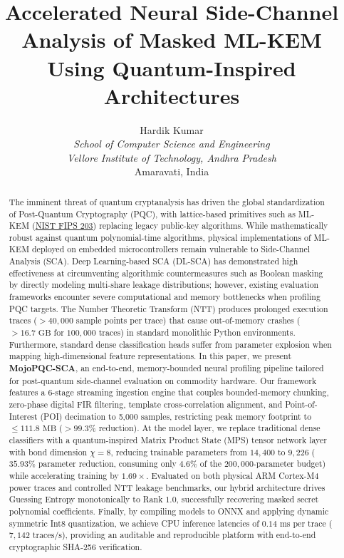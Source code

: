 \documentclass[letterpaper]{article}
\title{Accelerated Neural Side-Channel Analysis of Masked ML-KEM Using Quantum-Inspired Architectures}
\author{
    Hardik Kumar \\
    \textit{School of Computer Science and Engineering} \\
    \textit{Vellore Institute of Technology, Andhra Pradesh} \\
    Amaravati, India
}
\begin{document}
\thispagestyle{firstpagehf}
\maketitle

\begin{abstract}
The imminent threat of quantum cryptanalysis has driven the global standardization of Post-Quantum Cryptography (PQC), with lattice-based primitives such as ML-KEM (\href{https://csrc.nist.gov/pubs/fips/203/final}{NIST FIPS 203}) replacing legacy public-key algorithms. While mathematically robust against quantum polynomial-time algorithms, physical implementations of ML-KEM deployed on embedded microcontrollers remain vulnerable to Side-Channel Analysis (SCA). Deep Learning-based SCA (DL-SCA) has demonstrated high effectiveness at circumventing algorithmic countermeasures such as Boolean masking by directly modeling multi-share leakage distributions; however, existing evaluation frameworks encounter severe computational and memory bottlenecks when profiling PQC targets. The Number Theoretic Transform (NTT) produces prolonged execution traces ($>40,000$ sample points per trace) that cause out-of-memory crashes ($>16.7\text{ GB}$ for $100,000$ traces) in standard monolithic Python environments. Furthermore, standard dense classification heads suffer from parameter explosion when mapping high-dimensional feature representations. In this paper, we present \textbf{MojoPQC-SCA}, an end-to-end, memory-bounded neural profiling pipeline tailored for post-quantum side-channel evaluation on commodity hardware. Our framework features a 6-stage streaming ingestion engine that couples bounded-memory chunking, zero-phase digital FIR filtering, template cross-correlation alignment, and Point-of-Interest (POI) decimation to 5,000 samples, restricting peak memory footprint to $\le 111.8\text{ MB}$ ($>99.3\%$ reduction). At the model layer, we replace traditional dense classifiers with a quantum-inspired Matrix Product State (MPS) tensor network layer with bond dimension $\chi = 8$, reducing trainable parameters from $14,400$ to $9,226$ ($35.93\%$ parameter reduction, consuming only $4.6\%$ of the $200,000$-parameter budget) while accelerating training by $1.69\times$. Evaluated on both physical ARM Cortex-M4 power traces and controlled NTT leakage benchmarks, our hybrid architecture drives Guessing Entropy monotonically to Rank $1.0$, successfully recovering masked secret polynomial coefficients. Finally, by compiling models to ONNX and applying dynamic symmetric Int8 quantization, we achieve CPU inference latencies of $0.14\text{ ms per trace}$ ($7,142\text{ traces/s}$), providing an auditable and reproducible platform with end-to-end cryptographic SHA-256 verification.
\end{abstract}
\end{document}
